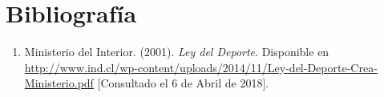 \newpage
\section{Bibliografía}

\begin{enumerate}

\item Ministerio del Interior. (2001). \textit{Ley del Deporte}. Disponible en \url{http://www.ind.cl/wp-content/uploads/2014/11/Ley-del-Deporte-Crea-Ministerio.pdf} [Consultado el 6 de Abril de 2018].

\end{enumerate}